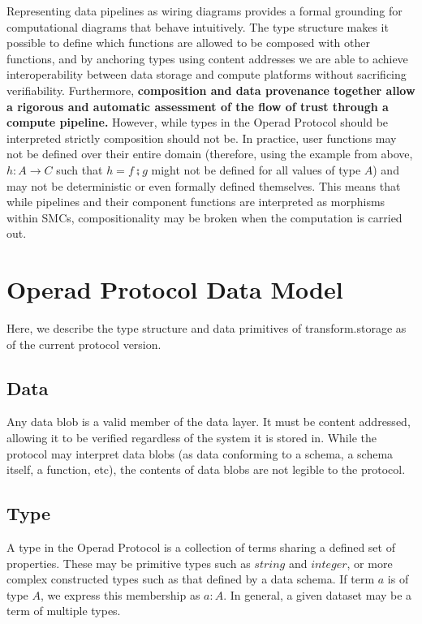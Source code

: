 \documentclass[9pt, oneside]{article}   	%
\begin{document}
Representing data pipelines as wiring diagrams provides a formal grounding for computational diagrams that behave intuitively. The type structure makes it possible to define which functions are allowed to be composed with other functions, and by anchoring types using content addresses we are able to achieve interoperability between data storage and compute platforms without sacrificing verifiability. Furthermore, \textbf{composition and data provenance together allow a rigorous and automatic assessment of the flow of trust through a compute pipeline.}  However, while types in the Operad Protocol should be interpreted strictly composition should not be. In practice, user functions may not be defined over their entire domain (therefore, using the example from above, $h : A \rightarrow C$ such that $h = f \zcmp g$ might not be defined for all values of type $A$) and may not be deterministic or even formally defined themselves. This means that while pipelines and their component functions are interpreted as morphisms within SMCs, compositionality may be broken when the computation is carried out. 



\section{Operad Protocol Data Model}\label{transformtypes}

Here, we describe the type structure and data primitives of transform.storage as of the current protocol version.

\subsection{Data}\label{data}

Any data blob is a valid member of the data layer. It must be content addressed, allowing it to be verified regardless of the system it is stored in. While the protocol may interpret data blobs (as data conforming to a schema, a schema itself, a function, etc), the contents of data blobs are not legible to the protocol.

\subsection{Type}\label{type}

A type in the Operad Protocol is a collection of terms sharing a defined set of properties. These may be primitive types such as $string$ and $integer$, or more complex constructed types such as that defined by a data schema. If term $a$ is of type $A$, we express this membership as $a:A$. In general, a given dataset may be a term of multiple types.
\end{document}
